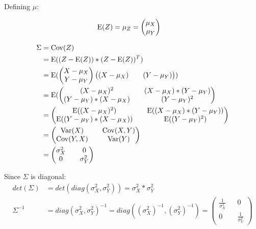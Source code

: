 Defining  $\mu:$


\begin{align*}
	\mathrm{E}(Z) &= \mu_{Z} = \begin{pmatrix}
			\mu_{X} \\
			\mu_{Y} 
			\end{pmatrix}
\end{align*}

\begin{align*}
\Sigma &= \mathrm{Cov}(Z) \\
&= \mathrm{E}((Z-\mathrm{E}(Z))*(Z-\mathrm{E}(Z))^T) \\
&=\mathrm{E}(\begin{pmatrix}
		X-\mu_{X} \\
		Y-\mu_{Y} 
\end{pmatrix}
\begin{pmatrix}
(X-\mu_{X}) &&
(Y-\mu_{Y}) 
\end{pmatrix}) \\
&=
\mathrm{E}(\begin{pmatrix}
(X-\mu_{X})^2 && (X-\mu_{X})*(Y-\mu_{Y}) \\
(Y-\mu_{Y})*(X-\mu_{X}) &&  (Y-\mu_{Y})^2 
\end{pmatrix} \\
&=
\begin{pmatrix}
\mathrm{E}((X-\mu_{X})^2) && \mathrm{E}((X-\mu_{X})*(Y-\mu_{Y})) \\
\mathrm{E}((Y-\mu_{Y})*(X-\mu_{X})) &&  \mathrm{E}((Y-\mu_{Y})^2) 
\end{pmatrix} \\
&=
\begin{pmatrix}
\mathrm{Var}(X) && \mathrm{Cov}(X,Y) \\
\mathrm{Cov}(Y,X) && \mathrm{Var}(Y) 
\end{pmatrix} \\
&=
\begin{pmatrix}
\sigma_{X}^2 && 0 \\
 0           && \sigma_{Y}^2 
\end{pmatrix}
\end{align*}

Since $\Sigma$ is diagonal:\\
\begin{align*}
det(\Sigma) &= det(diag(\sigma_{X}^2,\sigma_{Y}^2))= \sigma_{X}^2*\sigma_{Y}^2\\
\Sigma^{-1} &= diag(\sigma_{X}^2,\sigma_{Y}^2)^{-1}=diag((\sigma_{X}^2)^{-1},(\sigma_{Y}^2)^{-1})=\begin{pmatrix}
\frac{1}{\sigma_{X}^2} && 0 \\
0           && \frac{1}{\sigma_{Y}^2} 
\end{pmatrix} \\
\end{align*}


